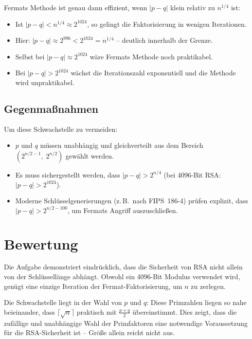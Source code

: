 \documentclass[
    fontsize=12pt,          %
    paper=a4,               %
    numbers=noenddot,       %
    listof=totoc,           %
    listof=entryprefix,     %
    listof=nochaptergap,    %
    bibliography=totoc,     %
    parskip=half,           %
    openany                 %
]{scrbook}
\begin{document}
Fermats Methode ist genau dann effizient, wenn $|p - q|$ klein relativ zu $n^{1/4}$ ist:
\begin{itemize}
    \item Ist $|p - q| < n^{1/4} \approx 2^{1024}$, so gelingt die Faktorisierung in wenigen Iterationen.
    \item Hier: $|p - q| \approx 2^{996} < 2^{1024} = n^{1/4}$ -- deutlich innerhalb der Grenze.
    \item Selbst bei $|p - q| \approx 2^{1024}$ wäre Fermats Methode noch praktikabel.
    \item Bei $|p - q| > 2^{1024}$ wächst die Iterationszahl exponentiell und die Methode wird unpraktikabel.
\end{itemize}


\subsection*{Gegenmaßnahmen}

Um diese Schwachstelle zu vermeiden:
\begin{itemize}
    \item $p$ und $q$ müssen unabhängig und gleichverteilt aus dem Bereich $(2^{n/2-1},\; 2^{n/2})$ gewählt werden.
    \item Es muss sichergestellt werden, dass $|p - q| > 2^{n/4}$ (bei 4096-Bit RSA: $|p - q| > 2^{1024}$).
    \item Moderne Schlüsselgenerierungen (z.\,B.\ nach FIPS~186-4) prüfen explizit, dass $|p - q| > 2^{n/2 - 100}$, um Fermats Angriff auszuschließen.
\end{itemize}


\section*{Bewertung}

Die Aufgabe demonstriert eindrücklich, dass die Sicherheit von RSA nicht allein von der Schlüssellänge abhängt.
Obwohl ein 4096-Bit Modulus verwendet wird, genügt eine einzige Iteration der Fermat-Faktorisierung, um $n$ zu zerlegen.

Die Schwachstelle liegt in der Wahl von $p$ und $q$: Diese Primzahlen liegen so nahe beieinander, dass $\lceil\sqrt{n}\rceil$ praktisch mit $\frac{p+q}{2}$ übereinstimmt.
Dies zeigt, dass die zufällige und unabhängige Wahl der Primfaktoren eine notwendige Voraussetzung für die RSA-Sicherheit ist -- Größe allein reicht nicht aus.

\end{document}
